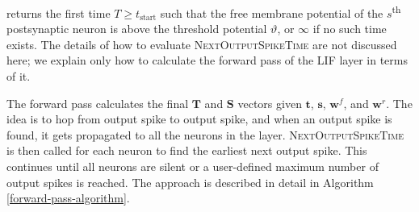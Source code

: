 \documentclass[12pt]{article}
\newcommand{\nost}{\textsc{NextOutputSpikeTime}}
\begin{document}
returns the first time $T \geq t_{\text{start}}$ such that the free membrane potential of the $s$\textsuperscript{th} postsynaptic neuron is above the threshold potential $\vartheta$, or $\infty$ if no such time exists. The details of how to evaluate \nost{} are not discussed here; we explain only how to calculate the forward pass of the LIF layer in terms of it.

The forward pass calculates the final $\mathbf{T}$ and $\mathbf{S}$ vectors given $\mathbf{t}$, $\mathbf{s}$, $\mathbf{w}^f$, and $\mathbf{w}^r$. The idea is to hop from output spike to output spike, and when an output spike is found, it gets propagated to all the neurons in the layer. \nost{} is then called for each neuron to find the earliest next output spike. This continues until all neurons are silent or a user-defined maximum number of output spikes is reached. The approach is described in detail in Algorithm \ref{forward-pass-algorithm}.
\end{document}
